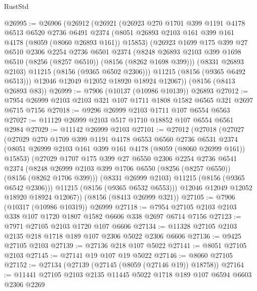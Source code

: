 \begin{lexlean}{RustStd}
\begin{coremodule}
@26995 := @26906
    (@26912
      (@26921
        (@26923
          @270
          @1701
          @399
          @1191
          @4178
          @6513
          @6520
          @2736
          @6491
          @2374
          (@8051 @26893 @2103 @161 @399 @161 @4178 (@8059 (@8060 @26893 @161)) @15853)
          (@26923
            @1699
            @175
            @399
            @27
            @6510
            @2306
            @2254
            @2736
            @6501
            @2374
            (@8248 @26893 @2103 @399 @1698 @6510 (@8256 (@8257 @6510)) (@8156 (@8262 @1698 @399)))
            (@8331 @26893 @2103)
            @11215
            (@8156 (@9365 @6502 @2306)))
          @11215
          (@8156 (@9365 @6492 @6513)))
        @12046
        @12049
        @12052
        @18920
        @18924
        @12067))
    (@8156 (@8413 @26893 @83))
@26999 := @7906 (@10137 (@10986 @10139)) @26893
@27012 := @7954 @26999 @2103 @2103 @321 @107 @1711 @1808 @1582 @6565 @321 @2697 @6715 @7156
@27018 := @9296 @26999 @2103 @1711 @107 @6554 @6563
@27027 := @11129 @26999 @2103 @517 @1710 @18852 @107 @6554 @6561 @2984
@27029 := @11142 @26999 @2103
@27101 := @27012
    (@27018
      (@27027
        (@27029
          @270
          @1709
          @399
          @1191
          @4178
          @6553
          @6560
          @2736
          @6531
          @2374
          (@8051 @26999 @2103 @161 @399 @161 @4178 (@8059 (@8060 @26999 @161)) @15853)
          (@27029
            @1707
            @175
            @399
            @27
            @6550
            @2306
            @2254
            @2736
            @6541
            @2374
            (@8248 @26999 @2103 @399 @1706 @6550 (@8256 (@8257 @6550)) (@8156 (@8262 @1706 @399)))
            (@8331 @26999 @2103)
            @11215
            (@8156 (@9365 @6542 @2306)))
          @11215
          (@8156 (@9365 @6532 @6553)))
        @12046
        @12049
        @12052
        @18920
        @18924
        @12067))
    (@8156 (@8413 @26999 @321))
@27105 := @7906 (@10317 (@10986 @10319)) @26999
@27118 := @7954 @27105 @2103 @2103 @338 @107 @1720 @1807 @1582 @6606 @338 @2697 @6714 @7156
@27123 := @7971 @27105 @2103 @1720 @107 @6606
@27134 := @11328 @27105 @2103 @2135 @218 @1718 @189 @107 @2306 @5022 @2306 @6606
@27136 := @9425 @27105 @2103
@27139 := @27136 @218 @107 @5022
@27141 := @8051 @27105 @2103
@27145 := @27141 @19 @107 @19 @5022
@27146 := @8060 @27105
@27152 := @27134 (@27139 (@27145 (@8059 (@27146 @19)) @18758))
@27164 := @11441 @27105 @2103 @2135 @11445 @5022 @1718 @189 @107 @6594 @6603 @2306 @2269

\end{coremodule}
\end{lexlean}
